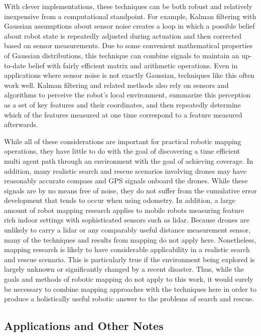 With clever implementations, these techniques can be both robust and relatively inexpensive from a computational standpoint. For example, Kalman filtering with Gaussian assumptions about sensor noise creates a loop in which a possible belief about robot state is repeatedly adjusted during actuation and then corrected based on sensor measurements. Due to some convenient mathematical properties of Gaussian distributions, this technique can combine signals to maintain an up-to-date belief with fairly efficient matrix and arithmetic operations. Even in applications where sensor noise is not exactly Gaussian, techniques like this often work well. Kalman filtering and related methods also rely on sensors and algorithms to perceive the robot's local environment, summarize this perception as a set of key features and their coordinates, and then repeatedly determine which of the features measured at one time correspond to a feature measured afterwards.


While all of these considerations are important for practical robotic mapping operations, they have little to do with the goal of discovering a time efficient multi agent path through an environment with the goal of achieving coverage. In addition, many realistic search and rescue scenarios involving drones may have reasonably accurate compass and GPS signals onboard the drones. While these signals are by no means free of noise, they do not suffer from the cumulative error development that tends to occur when using odometry. In addition, a large amount of robot mapping research applies to mobile robots measuring feature rich indoor settings with sophisticated sensors such as lidar. Because drones are unlikely to carry a lidar or any comparably useful distance measurement sensor, many of the techniques and results from mapping do not apply here. Nonetheless, mapping research is likely to have considerable applicability in a realistic search and rescue scenario. This is particularly true if the environment being explored is largely unknown or significantly changed by a recent disaster. Thus, while the goals and methods of robotic mapping do not apply to this work, it would surely be necessary to combine mapping approaches with the techniques here in order to produce a holistically useful robotic answer to the problems of search and rescue.

\subsection{Applications and Other Notes}


